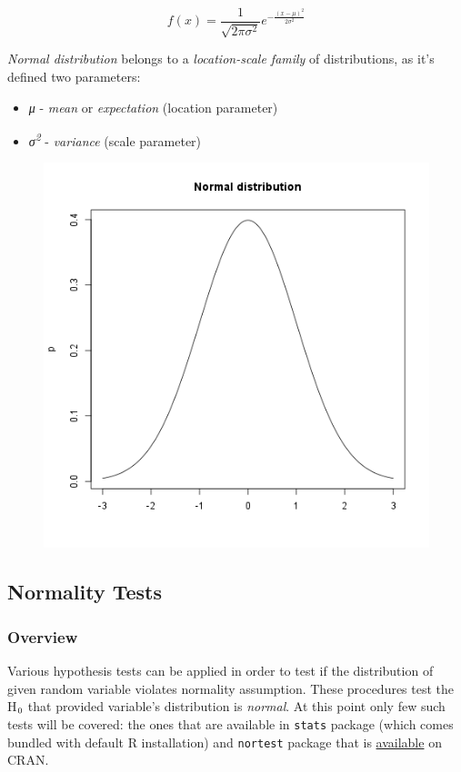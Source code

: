 \documentclass{article}
\makeatletter
\def\maxwidth{\ifdim\Gin@nat@width>\linewidth\linewidth
\else\Gin@nat@width\fi}
\let\Oldincludegraphics\includegraphics
\renewcommand{\includegraphics}[1]{\Oldincludegraphics[width=\maxwidth]{#1}}
\newcommand{\textsubscr}[1]{\ensuremath{_{\scriptsize\textrm{#1}}}}
\makeatother
\begin{document}
\[f(x) = \frac{1}{\sqrt{2\pi{}\sigma{}^2}} e^{-\frac{(x-\mu{})^2}{2\sigma{}^2}}\]

\emph{Normal distribution} belongs to a \emph{location-scale family} of
distributions, as it's defined two parameters:

\begin{itemize}
\item
  \emph{μ} - \emph{mean} or \emph{expectation} (location parameter)
\item
  \emph{σ\textsuperscript{2}} - \emph{variance} (scale parameter)
\end{itemize}
\begin{figure}[htbp]
\centering
\includegraphics{2f8c434e103f36ec70966b372838d448.png}
\caption{}
\end{figure}

\subsection{Normality Tests}

\subsubsection{Overview}

Various hypothesis tests can be applied in order to test if the
distribution of given random variable violates normality assumption.
These procedures test the H\textsubscr{0} that provided variable's
distribution is \emph{normal}. At this point only few such tests will be
covered: the ones that are available in \texttt{stats} package (which
comes bundled with default R installation) and \texttt{nortest} package
that is
\href{http://cran.r-project.org/web/packages/nortest/index.html}{available}
on CRAN.
\end{document}
